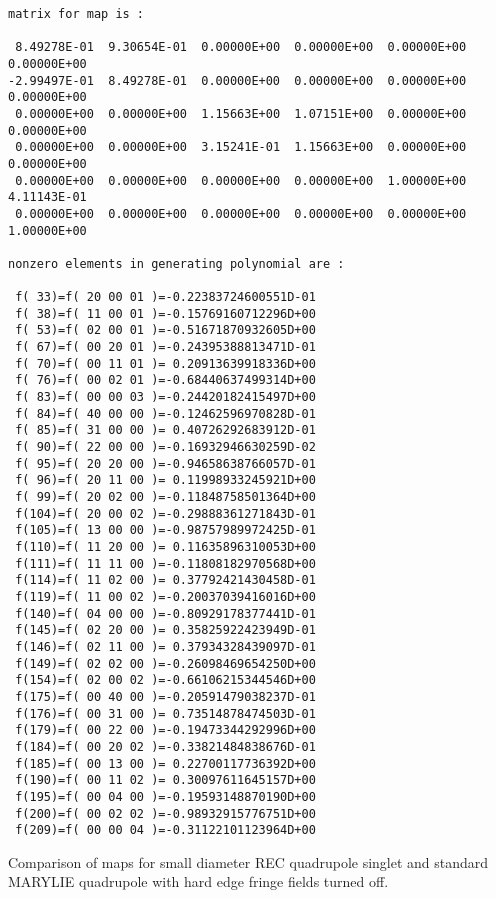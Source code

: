 \begin{footnotesize}
\begin{verbatim}
matrix for map is :

 8.49278E-01  9.30654E-01  0.00000E+00  0.00000E+00  0.00000E+00  0.00000E+00
-2.99497E-01  8.49278E-01  0.00000E+00  0.00000E+00  0.00000E+00  0.00000E+00
 0.00000E+00  0.00000E+00  1.15663E+00  1.07151E+00  0.00000E+00  0.00000E+00
 0.00000E+00  0.00000E+00  3.15241E-01  1.15663E+00  0.00000E+00  0.00000E+00
 0.00000E+00  0.00000E+00  0.00000E+00  0.00000E+00  1.00000E+00  4.11143E-01
 0.00000E+00  0.00000E+00  0.00000E+00  0.00000E+00  0.00000E+00  1.00000E+00

nonzero elements in generating polynomial are :

 f( 33)=f( 20 00 01 )=-0.22383724600551D-01
 f( 38)=f( 11 00 01 )=-0.15769160712296D+00
 f( 53)=f( 02 00 01 )=-0.51671870932605D+00
 f( 67)=f( 00 20 01 )=-0.24395388813471D-01
 f( 70)=f( 00 11 01 )= 0.20913639918336D+00
 f( 76)=f( 00 02 01 )=-0.68440637499314D+00
 f( 83)=f( 00 00 03 )=-0.24420182415497D+00
 f( 84)=f( 40 00 00 )=-0.12462596970828D-01
 f( 85)=f( 31 00 00 )= 0.40726292683912D-01
 f( 90)=f( 22 00 00 )=-0.16932946630259D-02
 f( 95)=f( 20 20 00 )=-0.94658638766057D-01
 f( 96)=f( 20 11 00 )= 0.11998933245921D+00
 f( 99)=f( 20 02 00 )=-0.11848758501364D+00
 f(104)=f( 20 00 02 )=-0.29888361271843D-01
 f(105)=f( 13 00 00 )=-0.98757989972425D-01
 f(110)=f( 11 20 00 )= 0.11635896310053D+00
 f(111)=f( 11 11 00 )=-0.11808182970568D+00
 f(114)=f( 11 02 00 )= 0.37792421430458D-01
 f(119)=f( 11 00 02 )=-0.20037039416016D+00
 f(140)=f( 04 00 00 )=-0.80929178377441D-01
 f(145)=f( 02 20 00 )= 0.35825922423949D-01
 f(146)=f( 02 11 00 )= 0.37934328439097D-01
 f(149)=f( 02 02 00 )=-0.26098469654250D+00
 f(154)=f( 02 00 02 )=-0.66106215344546D+00
 f(175)=f( 00 40 00 )=-0.20591479038237D-01
 f(176)=f( 00 31 00 )= 0.73514878474503D-01
 f(179)=f( 00 22 00 )=-0.19473344292996D+00
 f(184)=f( 00 20 02 )=-0.33821484838676D-01
 f(185)=f( 00 13 00 )= 0.22700117736392D+00
 f(190)=f( 00 11 02 )= 0.30097611645157D+00
 f(195)=f( 00 04 00 )=-0.19593148870190D+00
 f(200)=f( 00 02 02 )=-0.98932915776751D+00
 f(209)=f( 00 00 04 )=-0.31122101123964D+00
\end{verbatim}
\end{footnotesize}
Comparison of maps for small diameter REC quadrupole singlet
and standard MARYLIE quadrupole with hard edge fringe fields
turned off.
